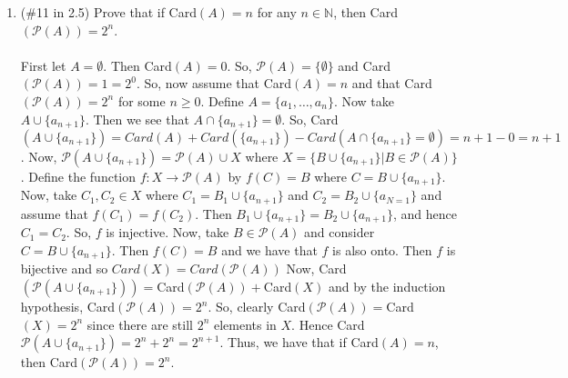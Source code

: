\documentclass[12pt]{article}
\begin{document}
\begin{enumerate}
\item (\#11 in 2.5) Prove that if Card$(A) = n$ for any $n\in \mathbb{N}$, then Card$(\mathcal{P}(A))=2^n$.\\\\
First let $A=\emptyset$. Then Card$(A)=0$. So, $\mathcal{P}(A)=\{\emptyset\}$ and Card$(\mathcal{P}(A))=1=2^0$. So, now assume that Card$(A)=n$ and that Card$(\mathcal{P}(A))=2^n$ for some $n\geq0$. Define $A=\{a_1,\ldots, a_n\}$. Now take $A\cup\{a_{n+1}\}$. Then we see that $A\cap\{a_{n+1}\}=\emptyset$. So, Card$(A\cup\{a_{n+1}\})=Card(A)+Card(\{a_{n+1}\})-Card(A\cap\{a_{n+1}\}=\emptyset)=n+1-0=n+1$. Now, $\mathcal{P}(A\cup\{a_{n+1}\})=\mathcal{P}(A)\cup X$ where $X=\{B\cup \{a_{n+1}\}|B\in\mathcal{P}(A)\}$. Define the function $f:X\rightarrow\mathcal{P}(A)$ by $f(C)=B$ where $C=B\cup \{a_{n+1}\}$. Now, take $C_1,C_2\in X$ where $C_1=B_1\cup \{a_{n+1}\}$ and $C_2=B_2\cup \{a_{N=1}\}$ and assume that $f(C_1)=f(C_2)$. Then $B_1\cup \{a_{n+1}\}=B_2\cup \{a_{n+1}\}$, and hence $C_1=C_2$. So, $f$ is injective. Now, take $B\in\mathcal{P}(A)$ and consider $C=B\cup \{a_{n+1}\}$. Then $f(C)=B$ and we have that $f$ is also onto. Then $f$ is bijective and so $Card(X)=Card(\mathcal{P}(A))$ Now, Card$(\mathcal{P}(A\cup\{a_{n+1}\}))=$Card$(\mathcal{P}(A))+$Card$(X)$ and by the induction hypothesis, Card$(\mathcal{P}(A))=2^n$. So, clearly Card$(\mathcal{P}(A))=$Card$(X)=2^n$ since there are still $2^n$ elements in $X$. Hence Card$\mathcal{P}(A\cup\{a_{n+1}\})=2^n+2^n=2^{n+1}$. Thus, we have that if Card$(A)=n$, then Card$(\mathcal{P}(A))=2^n$.
\end{enumerate}
\end{document}
